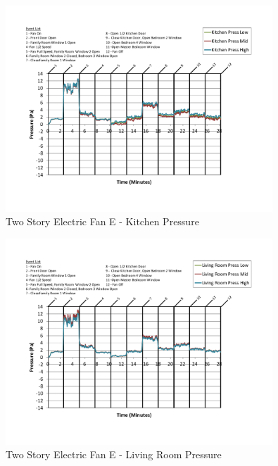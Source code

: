 \documentclass{article}
\begin{document}
\begin{appendices}
	\begin{figure}[H]
		\centering
		\includegraphics[height=3.05in,trim=0.67in 1.1in 0.67in 0.8in,clip=true]{0_Images/Results_Charts/ColdFlow/Two_Story/Electric/E/Kitchen_Pressure.pdf}
		\caption{Two Story Electric Fan E - Kitchen Pressure}
	\end{figure}
 

	\begin{figure}[H]
		\centering
		\includegraphics[height=3.05in,trim=0.67in 1.1in 0.67in 0.8in,clip=true]{0_Images/Results_Charts/ColdFlow/Two_Story/Electric/E/Living_Room_Pressure.pdf}
		\caption{Two Story Electric Fan E - Living Room Pressure}
	\end{figure}
 
	\clearpage


\end{appendices}
\end{document}
